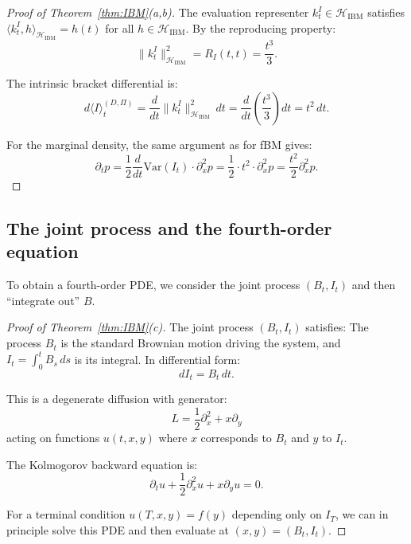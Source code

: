 \documentclass[12pt]{article}
\theoremstyle{plain}
\theoremstyle{definition}
\theoremstyle{remark}
\newcommand{\HH}{\mathcal{H}}
\begin{document}
\begin{proof}[Proof of Theorem~\ref{thm:IBM}(a,b)]
The evaluation representer $k_t^I \in \HH_{\mathrm{IBM}}$ satisfies $\langle k_t^I, h \rangle_{\HH_{\mathrm{IBM}}} = h(t)$ for all $h \in \HH_{\mathrm{IBM}}$. By the reproducing property:
\begin{equation}\label{eq:IBM-representer-norm}
\|k_t^I\|_{\HH_{\mathrm{IBM}}}^2 = R_I(t,t) = \frac{t^3}{3}.
\end{equation}

The intrinsic bracket differential is:
\begin{equation}\label{eq:IBM-bracket}
d\langle I \rangle_t^{(D,\Pi)} = \frac{d}{dt}\|k_t^I\|_{\HH_{\mathrm{IBM}}}^2 \, dt = \frac{d}{dt}\left(\frac{t^3}{3}\right) dt = t^2 \, dt.
\end{equation}

For the marginal density, the same argument as for fBM gives:
\begin{equation}\label{eq:IBM-density-PDE}
\partial_t p = \frac{1}{2}\frac{d}{dt}\mathrm{Var}(I_t) \cdot \partial_x^2 p = \frac{1}{2} \cdot t^2 \cdot \partial_x^2 p = \frac{t^2}{2}\partial_x^2 p.
\end{equation}
\end{proof}

\subsection{The joint process and the fourth-order equation}

To obtain a fourth-order PDE, we consider the joint process $(B_t, I_t)$ and then ``integrate out'' $B$.

\begin{proof}[Proof of Theorem~\ref{thm:IBM}(c)]
The joint process $(B_t, I_t)$ satisfies:
The process $B_t$ is the standard Brownian motion driving the system, and $I_t = \int_0^t B_s\,ds$ is its integral. In differential form:
\begin{equation}\label{eq:joint-SDE}
dI_t = B_t \, dt.
\end{equation}

This is a degenerate diffusion with generator:
\begin{equation}\label{eq:joint-generator}
L = \frac{1}{2}\partial_x^2 + x\partial_y
\end{equation}
acting on functions $u(t,x,y)$ where $x$ corresponds to $B_t$ and $y$ to $I_t$.

The Kolmogorov backward equation is:
\begin{equation}\label{eq:joint-backward}
\partial_t u + \frac{1}{2}\partial_x^2 u + x\partial_y u = 0.
\end{equation}

For a terminal condition $u(T,x,y) = f(y)$ depending only on $I_T$, we can in principle solve this PDE and then evaluate at $(x,y) = (B_t, I_t)$.
\end{proof}
\end{document}
